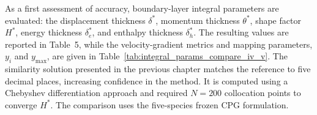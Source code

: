 As a first assessment of accuracy, boundary-layer integral parameters are evaluated: the displacement thickness $\delta^*$, momentum thickness $\theta^*$, shape factor $H^*$, energy thickness $\delta_e^*$, and enthalpy thickness $\delta_h^*$. The resulting values are reported in Table~5, while the velocity-gradient metrics and mapping parameters, $y_i$ and $y_{\max}$, are given in Table~\ref{tab:integral_params_compare_iv_v}. The similarity solution presented in the previous chapter matches the reference to five decimal places, increasing confidence in the method. It is computed using a Chebyshev differentiation approach and required $N=200$ collocation points to converge $H^*$. The comparison uses the five-species frozen \gls{CPG} formulation.







